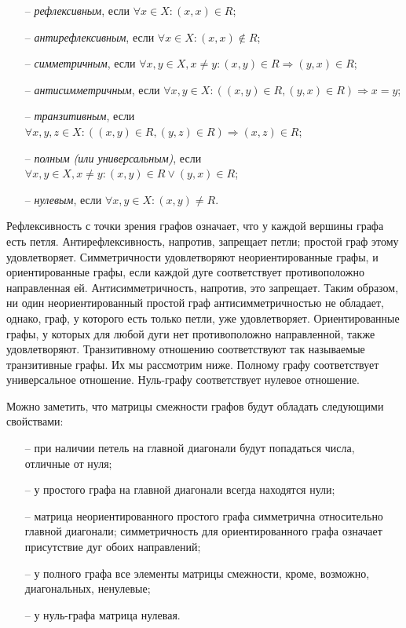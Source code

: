 \begin{itemize}
	\item[--] \emph{рефлексивным}, если $\forall x \in X \colon (x,x) \in R$;
	\item[--] \emph{антирефлексивным}, если $\forall x \in X \colon (x,x) 
	\notin R$;
	\item[--] \emph{симметричным}, если $\forall x,y \in X, x \neq y \colon 
	(x,y) \in R \Rightarrow (y,x) \in R$;
	\item[--] \emph{антисимметричным}, если $\forall x,y \in X \colon ((x,y) 
	\in R,(y,x) \in R) \Rightarrow x = y$;
	\item[--] \emph{транзитивным}, если $\forall x,y,z \in X \colon ((x,y) \in 
	R, (y,z) \in R) \Rightarrow (x,z) \in R$;
	\item[--] \emph{полным (или универсальным)}, если $\forall x,y \in X, x 
	\neq y \colon (x,y) \in R \vee (y,x) \in R$;
	\item[--] \emph{нулевым}, если $\forall x,y \in X \colon (x,y) \neq R$.
\end{itemize}

Рефлексивность с точки зрения графов означает, что у каждой вершины графа есть
петля. Антирефлексивность, напротив, запрещает петли; простой граф этому 
удовлетворяет. Симметричности удовлетворяют неориентированные графы, и 
ориентированные графы, если каждой дуге соответствует противоположно 
направленная ей. Антисимметричность, напротив, это запрещает. Таким образом,
ни один неориентированный простой граф антисимметричностью не обладает, однако,
граф, у которого есть только петли, уже удовлетворяет. Ориентированные графы, у
которых для любой дуги нет противоположно направленной, также удовлетворяют.
Транзитивному отношению соответствуют так называемые транзитивные графы. Их мы
рассмотрим ниже. Полному графу соответствует универсальное отношение. 
Нуль-графу соответствует нулевое отношение.

Можно заметить, что матрицы смежности графов будут обладать следующими 
свойствами:

\begin{itemize}
	\item[--] при наличии петель на главной диагонали будут попадаться числа, 
	отличные от нуля;
	\item[--] у простого графа на главной диагонали всегда находятся нули;
	\item[--] матрица неориентированного простого графа симметрична относительно
	главной диагонали; симметричность для ориентированного графа означает
	присутствие дуг обоих направлений;
	\item[--] у полного графа все элементы матрицы смежности, кроме, возможно,
	диагональных, ненулевые;
	\item[--] у нуль-графа матрица нулевая.
\end{itemize}

